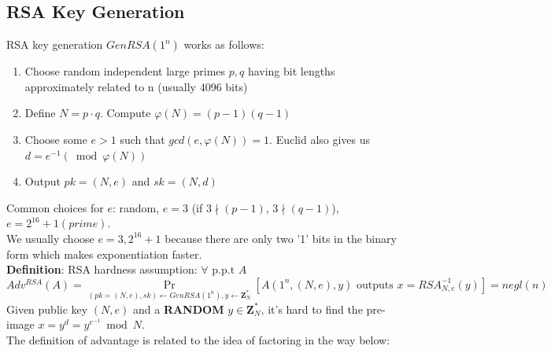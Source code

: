 \documentclass{scribe}
\begin{document}
\subsection{RSA Key Generation}
RSA key generation $GenRSA(1^n)$ works as follows:
\begin{enumerate}
    \item Choose random independent large primes $p,q$ having bit lengths approximately related to n (usually 4096 bits)
    \item Define $N = p \cdot q$. Compute $\varphi(N) = (p-1)(q-1)$
    \item Choose some $e>1$ such that $gcd(e,\varphi(N)) = 1$. Euclid also gives us $d = e^{-1} (\bmod \varphi(N))$
    \item Output $pk = (N,e)$ and $sk = (N,d)$
\end{enumerate}
Common choices for $e$: random, $e=3$ (if $3 \nmid (p-1)$, $3 \nmid (q-1)$), $e = 2^{16} +1 (prime)$. 
\\
We usually choose $e=3, 2^{16} +1$ because there are only two '1' bits in the binary form which makes exponentiation faster.
\vspace{5mm}
\\
\textbf{Definition}: RSA hardness assumption: $\forall \text{ p.p.t } A$
\[Adv^{RSA}(A) = \Pr_{(pk=(N,e), sk) \leftarrow GenRSA(1^n), y \leftarrow \mathbf{Z}_N^*} [A(1^n, (N,e), y) \text{ outputs }x=RSA_{N,e}^{-1}(y)] = negl(n)\]
Given public key $(N,e)$ and a \textbf{RANDOM} $y \in \mathbf{Z}_N^*$, it's hard to find the pre-image $x=y^d = y^{e^{-1}} \bmod N$.
\vspace{5mm}
\\
The definition of advantage is related to the idea of factoring in the way below:
\end{document}

